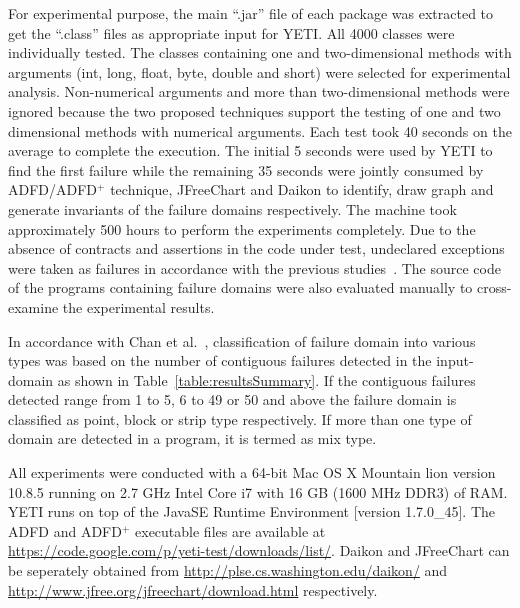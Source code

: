 For experimental purpose, the main ``.jar'' file of each package was extracted to get the ``.class'' files as appropriate input for YETI. All 4000 classes were individually tested. The classes containing one and two-dimensional methods with arguments (int, long, float, byte, double and short) were selected for experimental analysis. Non-numerical arguments and more than two-dimensional methods were ignored because the two proposed techniques support the testing of one and two dimensional methods with numerical arguments. Each test took 40 seconds on the average to complete the execution. The initial 5 seconds were used by YETI to find the first failure while the remaining 35 seconds were jointly consumed by ADFD/ADFD$^+$ technique, JFreeChart and Daikon to identify, draw graph and generate invariants of the failure domains respectively. The machine took approximately 500 hours to perform the experiments completely. Due to the absence of contracts and assertions in the code under test, undeclared exceptions were taken as failures in accordance with the previous studies~\cite{oriol2012random, ahmad2013adfd}. The source code of the programs containing failure domains were also evaluated manually to cross-examine the experimental results. 

In accordance with  Chan et al.~\cite{chan1996proportional}, classification of failure domain into various types was based on the number of contiguous failures detected in the input-domain as shown in Table~\ref{table:resultsSummary}. If the contiguous failures detected range from 1 to 5, 6 to 49 or 50 and above the failure domain is classified as point, block or strip type respectively. If more than one type of domain are detected in a program, it is termed as mix type. 

All experiments were conducted with a 64-bit Mac OS X Mountain lion version 10.8.5 running on 2.7 GHz Intel Core i7 with 16 GB (1600 MHz DDR3) of RAM. YETI runs on top of the Java\texttrademark  SE Runtime Environment [version 1.7.0\_45]. The ADFD and ADFD$^+$ executable files are available at \url{https://code.google.com/p/yeti-test/downloads/list/}. Daikon and JFreeChart can be seperately obtained from \url{http://plse.cs.washington.edu/daikon/} and \url{http://www.jfree.org/jfreechart/download.html} respectively. 

\bigskip

